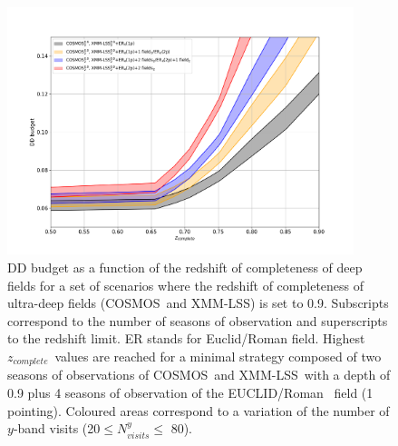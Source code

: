 \documentclass[\docopts]{\docclass}
\newcommand{\cosmos}{{\sc COSMOS}}
\newcommand{\xmm}{{\sc XMM-LSS}}
\newcommand{\adfs}{{\sc EUCLID/Roman}}
\newcommand{\zcomp}{\mbox{$z_{complete}$}}
\begin{document}
\begin{figure}[htbp]
\begin{center}
  \includegraphics[width=0.9\textwidth]{budget_zcomp.png}
  \caption{DD budget as a function of the redshift of completeness of deep fields for a set of scenarios where the redshift of completeness of ultra-deep fields (\cosmos~and \xmm) is set to 0.9. Subscripts correspond to the number of seasons of observation and superscripts to the redshift limit. ER stands for Euclid/Roman field. Highest \zcomp~values are reached for a minimal strategy composed of two seasons of observations of \cosmos~and \xmm~with a depth of 0.9 plus 4 seasons of observation of the \adfs~ field (1 pointing). Coloured areas correspond to a variation of the number of $y$-band visits (20$\leq N_{visits}^y \leq$ 80).}\label{fig:budget_zcomp}
\end{center}
\end{figure}
\par
\end{document}
